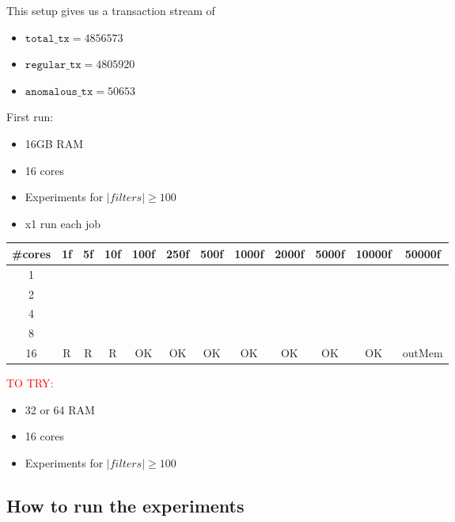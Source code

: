 This setup gives us a transaction stream of 
\begin{itemize}
  \item $\texttt{total\_tx} = 4856573$
  \item $\texttt{regular\_tx} = 4805920$
  \item $\texttt{anomalous\_tx} = 50653$
\end{itemize}

First run:
\begin{itemize}
    \item 16GB RAM
    \item 16 cores
    \item Experiments for $|filters|\ge100$
    \item x1 run each job
\end{itemize}

\begin{table}[H]
\begin{tabular}{|c|c|c|c|c|c|c|c|c|c|c|c|}
\hline
\#cores & 1f & 5f & 10f & 100f & 250f & 500f & 1000f & 2000f & 5000f & 10000f & 50000f \\ \hline
1       &    &    &     &      &      &      &       &       &       &        &        \\ \hline
2       &    &    &     &      &      &      &       &       &       &        &        \\ \hline
4       &    &    &     &      &      &      &       &       &       &        &        \\ \hline
8       &    &    &     &      &      &      &       &       &       &        &        \\ \hline
16      & R & R & R & OK & OK & OK & OK & OK & OK & OK & outMem \\ \hline
\end{tabular}
\end{table}

\textcolor{red}{TO TRY:}
\begin{itemize}
    \item 32 or 64 RAM
    \item 16 cores
    \item Experiments for $|filters|\ge100$
\end{itemize}


\subsection{How to run the experiments}

